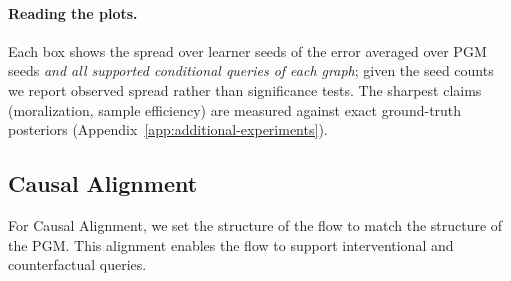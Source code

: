 \paragraph{Reading the plots.} Each box shows the spread over learner seeds of the error averaged over PGM seeds \emph{and all supported conditional queries of each graph}; given the seed counts we report observed spread rather than significance tests. The sharpest claims (moralization, sample efficiency) are measured against exact ground-truth posteriors (Appendix~\ref{app:additional-experiments}).

\subsection{Causal Alignment}

For Causal Alignment, we set the structure of the flow to match the structure of the PGM. This alignment enables the flow to support interventional and counterfactual queries.

